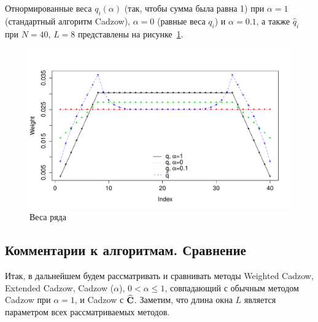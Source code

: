 \documentclass[12pt,a4paper,fleqn,leqno]{article}
\begin{document}
Отнормированные веса $q_i(\alpha)$ (так, чтобы сумма была равна 1) при $\alpha = 1$ (стандартный алгоритм Cadzow), $\alpha = 0$ (равные веса $q_i$) и $\alpha = 0.1$,
 а также $\hat{q}_i$ при $N = 40$, $L = 8$ представлены на рисунке~\ref{img_weights}.
\begin{figure}[!h] \begin{center}
\includegraphics[width = \textwidth]{weights.pdf}\caption{Веса ряда}\label{img_weights}
\end{center}\end{figure}

\subsection{Комментарии к алгоритмам. Сравнение}

Итак, в дальнейшем будем рассматривать и сравнивать методы
Weighted Cadzow, Extended Cadzow, Cadzow ($\alpha$), $0< \alpha \leq 1$, совпадающий с обычным методом Cadzow при $\alpha=1$,
и Cadzow с $\widehat {\mathbf{C}}$.
Заметим, что длина окна $L$ является параметром всех рассматриваемых методов.
\end{document}
